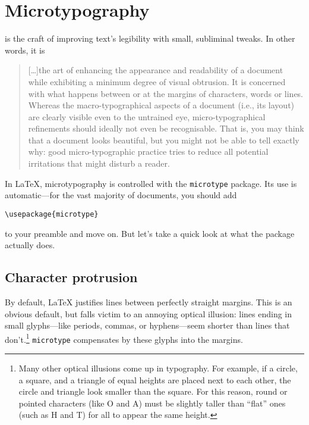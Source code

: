 \chapter{Microtypography}
\label{microtype}

 is the craft of improving text's legibility
with small, subliminal tweaks.
In other words, it is
\begin{quote}
\small
[\dots]the art of enhancing the appearance and readability of a
document while exhibiting a minimum degree of visual obtrusion.
It is concerned with what happens between or at the margins of characters,
words or lines. Whereas the macro-typographical aspects of a document
(i.e., its layout) are clearly visible even to the untrained eye,
micro-typographical refinements should ideally not even be recognisable.
That is, you may think that a document looks beautiful, but you
might not be able to tell exactly why: good micro-typographic practice tries to
reduce all potential irritations that might disturb a reader.\punckern{}
\end{quote}

In \LaTeX{}, microtypography is controlled with the
\texttt{microtype} package.
Its use is automatic---for the vast majority of documents, you should add
\begin{leftfigure}
\begin{lstlisting}
\usepackage{microtype}
\end{lstlisting}
\end{leftfigure}
to your preamble and move on.
But let's take a quick look at what the package actually does.

\section{Character protrusion}

By default, \LaTeX{} justifies lines between perfectly straight margins.
This is an obvious default,
but falls victim to an annoying optical illusion:
lines ending in small glyphs---like periods, commas,
or hyphens---seem shorter than lines that
don't.\punckern\footnote{Many other optical illusions come up in typography.
For example, if a circle, a square, and a triangle
of equal heights are placed next to each other,
the circle and triangle look smaller than the square.
For this reason, round or pointed characters (like O and A) must
be slightly taller than ``flat'' ones (such as H and T) for all
to appear the same height.\punckern{}}
\texttt{microtype} compensates by  these glyphs
into the margins.

